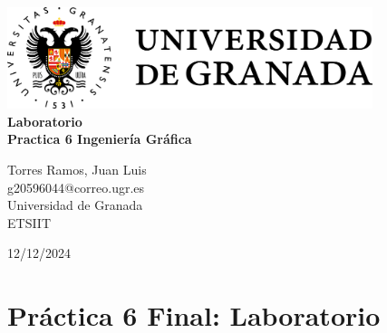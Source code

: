 \documentclass{article}
\begin{document}
\begin{center}
  \vspace*{0.5\baselineskip} %
  \includegraphics[width=0.8\textwidth]{ugr-2.png}\\
  \vfill
  {\Huge \textbf{Laboratorio}}\\ %
  \vspace*{2\baselineskip}
  {\LARGE \textbf{Practica 6 Ingeniería Gráfica}}\\
  \begin{large}
    \vspace*{1\baselineskip}
    {\Large Torres Ramos, Juan Luis \\}
	\vspace*{0.5\baselineskip}
    {{ g20596044@correo.ugr.es}}\\[1cm]
    \vfill
	{Universidad de Granada}\\
    {\large ETSIIT}\par
	{\large 12/12/2024}\par
	\vspace*{3\baselineskip}
  \end{large}
  \thispagestyle{empty} 
\end{center}
\pagebreak









\setcounter{page}{1}

\section*{Práctica 6 Final: Laboratorio}
\end{document}
